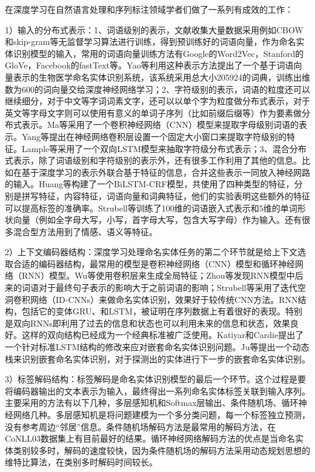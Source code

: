\documentclass[winfonts,master,oneside,nobackinfo]{njuthesis}
\begin{document}
在深度学习在自然语言处理和序列标注领域学者们做了一系列有成效的工作：

1）输入的分布式表示：1、词语级别的表示，文献\cite{Nguyen}收集大量数据采用例如CBOW和skip-gram等无监督学习算法进行训练，得到预训练好的词语向量，作为命名实体识别模型的输入，常用的词语向量训练方法有Google的Word2Vec，Stanford的GloVe，Facebook的fastText等。Yao等\cite{Yao}利用这种表示方法提出了一个基于词语向量表示的生物医学命名实体识别系统，该系统采用总大小205924的词典，训练出维数为600的词向量交给深度神经网络学习；2、字符级别的表示，词语的粒度还可以继续细分\cite{Kuru}，对于中文等字词词素文字，还可以以单个字为粒度做分布式表示，对于英文等字母文字则可以使用有意义的单词子序列（比如前缀后缀等）作为要素做分布式表示。Ma等\cite{Ma}采用了一个卷积神经网络（CNN）模型来提取字母级别词语的表示。Yang等\cite{Yang}提出在神经网络卷积层设置一个固定大小窗口来提取字符级别的特征。Lample等\cite{Lample}采用了一个双向LSTM模型来抽取字符级分布式表示；3、混合分布式表示，除了词语级别和字符级别的表示外，还有很多工作利用了其他的信息。比如在基于深度学习的表示外联合基于特征的信息，合并这些表示一同放入神经网路的输入。Huang等\cite{Huang}构建了一个BiLSTM-CRF模型，共使用了四种类型的特征，分别是拼写特征，内容特征，词语向量和词典特征，他们的实验表明这些额外的特征可以提高标签的准确率。Strubell等\cite{Strubell}训练了100维的词语嵌入式表示和5维的单词形状向量（例如全字母大写，小写，首字母大写，包含大写字母）作为输入。还有很多混合型方法用到了情感、语义\cite{Jansson}等特征。

2）上下文编码器结构：深度学习处理命名实体任务的第二个环节就是给上下文选取合适的编码器结构，最常用的模型是卷积神经网络（CNN）模型和循环神经网络（RNN）模型。Wu等\cite{Wu}使用卷积层来生成全局特征；Zhou等\cite{zhou}发现RNN模型中后来的词语对于最终句子表示的影响大于之前词语的影响；Strubell\cite{Strubell}等采用了迭代空洞卷积网络（ID-CNNs）来做命名实体识别，效果好于较传统CNN方法。RNN结构，包括它的变体GRU、和LSTM，被证明在序列数据上有着很好的表现。特别是双向RNNs\cite{Huang}即利用了过去的信息和状态也可以利用未来的信息和状态，效果良好。这样的双向结构已经成为一个经典标准被广泛使用。Katiyar和Cardie\cite{Katiyar}提出了一个针对标准LSTM结构的修改来应对嵌套命名实体识别问题。Ju等\cite{Ju}提出一个动态栈来识别嵌套命名实体识别，对于探测出的实体进行下一步的嵌套命名实体识别。

3）标签解码结构：标签解码是命名实体识别模型的最后一个环节。这个过程是要将编码器输出的文本表示为输入，最终得出一系列命名实体标签关联到输入序列。主要采用的方法有以下几种，多层感知机和Softmax层输出\cite{Strubell}、条件随机场\cite{Huang}、循环神经网络\cite{Shen}几种。多层感知机是将问题建模为一个多分类问题，每一个标签独立预测，没有参考周边“邻居”信息。条件随机场解码方法是最常用的解码方法，在CoNLL03数据集上有目前最好的结果\cite{Akbik}。循环神经网络解码方法的优点是当命名实体类别较多时，解码的速度较快\cite{Shen}，因为条件随机场的解码方法采用动态规划思想的维特比算法，在类别多时解码时间较长。
\end{document}
